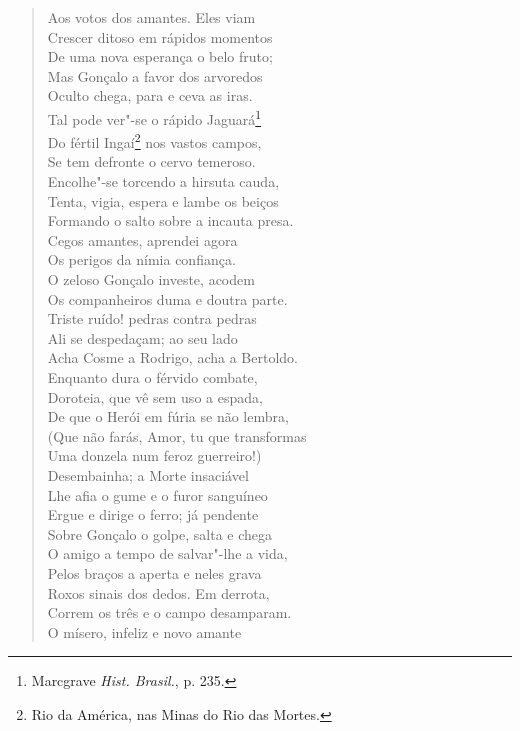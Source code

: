 \begin{verse}
Aos votos dos amantes. Eles viam\\
Crescer ditoso em rápidos momentos\\
De uma nova esperança o belo fruto;\\
Mas Gonçalo a favor dos arvoredos\\
Oculto chega, para e ceva as iras.\\
Tal pode ver"-se o rápido Jaguará\footnote{ Marcgrave \textit{Hist. Brasil.}, p. 235.}\\ \index{\Marc}
Do fértil Ingaí\footnote{ Rio da América, nas Minas do Rio das Mortes.}
nos vastos campos,\\
Se tem defronte o cervo temeroso.\\
Encolhe"-se torcendo a hirsuta cauda,\\
Tenta, vigia, espera e lambe os beiços\\
Formando o salto sobre a incauta presa.\\
Cegos amantes, aprendei agora\\
Os perigos da nímia confiança.\\
O zeloso Gonçalo investe, acodem\\
Os companheiros duma e doutra parte.\\
Triste ruído! pedras contra pedras\\
Ali se despedaçam; ao seu lado\\
Acha Cosme a Rodrigo, acha a Bertoldo.\\
Enquanto dura o férvido combate,\\
Doroteia, que vê sem uso a espada,\\
De que o Herói em fúria se não lembra,\\
(Que não farás, Amor, tu que transformas\\		\index{\Amor}
Uma donzela num feroz guerreiro!)\\
Desembainha; a Morte insaciável\\
Lhe afia o gume e o furor sanguíneo\\
Ergue e dirige o ferro; já pendente\\
Sobre Gonçalo o golpe, salta e chega\\
O amigo a tempo de salvar"-lhe a vida,\\
Pelos braços a aperta e neles grava\\
Roxos sinais dos dedos. Em derrota,\\
Correm os três e o campo desamparam.\\
O mísero, infeliz e novo amante\\

\end{verse}
